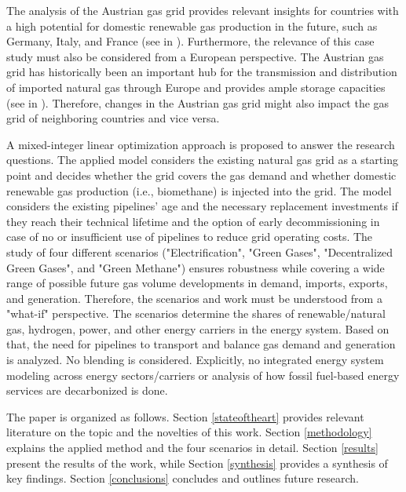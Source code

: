 The analysis of the Austrian gas grid provides relevant insights for countries with a high potential for domestic renewable gas production in the future, such as Germany, Italy, and France (see in \cite{scarlat2018biogas}). Furthermore, the relevance of this case study must also be considered from a European perspective. The Austrian gas grid has historically been an important hub for the transmission and distribution of imported natural gas through Europe and provides ample storage capacities (see in \cite{sesini2021strategic}). Therefore, changes in the Austrian gas grid might also impact the gas grid of neighboring countries and vice versa.\vspace{0.3cm}

A mixed-integer linear optimization approach is proposed to answer the research questions. The applied model considers the existing natural gas grid as a starting point and decides whether the grid covers the gas demand and whether domestic renewable gas production (i.e., biomethane) is injected into the grid. The model considers the existing pipelines' age and the necessary replacement investments if they reach their technical lifetime and the option of early decommissioning in case of no or insufficient use of pipelines to reduce grid operating costs. The study of four different scenarios ("Electrification", "Green Gases", "Decentralized Green Gases", and "Green Methane") ensures robustness while covering a wide range of possible future gas volume developments in demand, imports, exports, and generation. Therefore, the scenarios and work must be understood from a "what-if" perspective. The scenarios determine the shares of renewable/natural gas, hydrogen, power, and other energy carriers in the energy system. Based on that, the need for pipelines to transport and balance gas demand and generation is analyzed. No blending is considered. Explicitly, no integrated energy system modeling across energy sectors/carriers or analysis of how fossil fuel-based energy services are decarbonized is done.\vspace{0.3cm}

The paper is organized as follows. Section \ref{stateoftheart} provides relevant literature on the topic and the novelties of this work. Section \ref{methodology} explains the applied method and the four scenarios in detail. Section \ref{results} present the results of the work, while Section \ref{synthesis} provides a synthesis of key findings. Section \ref{conclusions} concludes and outlines future research.






